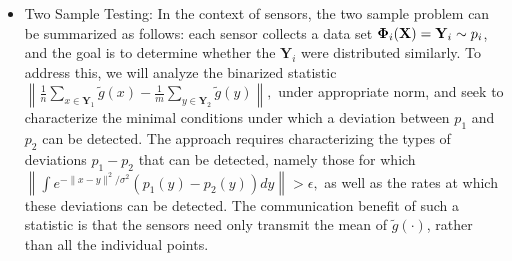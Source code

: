 \begin{itemize}
\item Two Sample Testing: 
In the context of sensors, the two sample problem can be summarized as follows: each sensor collects a data set $\mathbf{\Phi}_i(\mathbf{X})=\mathbf{Y}_i\sim p_i$, and the goal is to determine whether the $\mathbf{Y}_i$ were distributed similarly.  %
To address this, we will analyze the binarized statistic $\left\|\frac{1}{n}\sum_{x\in \mathbf{Y}_1} \widetilde{g}(x) - \frac{1}{m}\sum_{y\in \mathbf{Y}_2} \widetilde{g}(y)\right\|,$
under appropriate norm, and seek to characterize the minimal conditions under which a deviation between $p_1$ and $p_2$ can be detected.   The approach requires characterizing the types of deviations $p_1 - p_2$ that can be detected, namely those for which $\left\|\int e^{-\|x-y\|^2/\sigma^2} (p_1(y) - p_2(y)) dy \right\| > \epsilon,$ as well as the rates at which these deviations can be detected.
The communication benefit of such a statistic is that the sensors need
only transmit the mean of $\widetilde{g}(\cdot)$, rather than all the individual
points.  %


\end{itemize}
